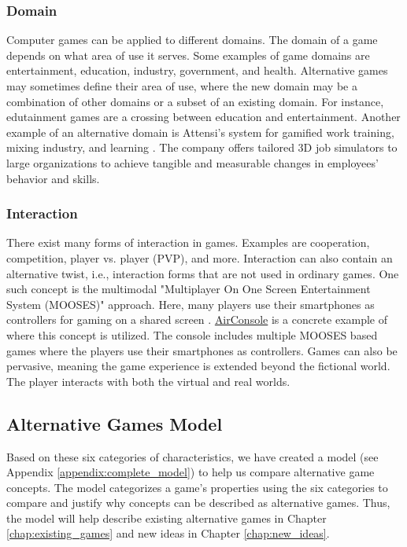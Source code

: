 \subsubsection{Domain}
Computer games can be applied to different domains. The domain of a game depends on what area of use it serves. Some examples of game domains are entertainment, education, industry, government, and health. Alternative games may sometimes define their area of use, where the new domain may be a combination of other domains or a subset of an existing domain. For instance, edutainment games are a crossing between education and entertainment. Another example of an alternative domain is Attensi’s system for gamified work training, mixing industry, and learning \citep{attensi_why_2020}. The company offers tailored 3D job simulators to large organizations to achieve tangible and measurable changes in employees’ behavior and skills.

\subsubsection{Interaction}
There exist many forms of interaction in games. Examples are cooperation, competition, player vs. player (PVP), and more. Interaction can also contain an alternative twist, i.e., interaction forms that are not used in ordinary games. One such concept is the multimodal "Multiplayer On One Screen Entertainment System (MOOSES)" approach. Here, many players use their smartphones as controllers for gaming on a shared screen \citep{wang_evaluation_2010}. \href{http://www.airconsole.com}{AirConsole} is a concrete example of where this concept is utilized. The console includes multiple MOOSES based games where the players use their smartphones as controllers. Games can also be pervasive, meaning the game experience is extended beyond the fictional world. The player interacts with both the virtual and real worlds.

\subsection{Alternative Games Model}
Based on these six categories of characteristics, we have created a model (see Appendix \ref{appendix:complete_model}) to help us compare alternative game concepts. The model categorizes a game’s properties using the six categories to compare and justify why concepts can be described as alternative games. Thus, the model will help describe existing alternative games in Chapter \ref{chap:existing_games} and new ideas in Chapter \ref{chap:new_ideas}.

